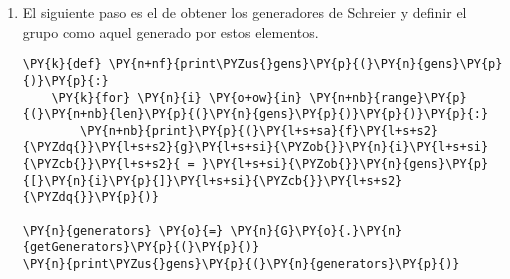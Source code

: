 \begin{enumerate}
    \begin{center}
    \end{center}


Como hemos comentado anteriormente, el número de filas sin contar las cabeceras indica el número de elementos del grupo $G/H$, que coincide con el índice $[G:H]$. En este ejemplo, se tiene:
\[
    [G:H] = \frac{|G|}{|H|} = \frac{|G|}{1} = |G| = 4 \: .
\]

\newpage
Equivalentemente, el grafo de Schreier asociado se llama de la siguiente forma:

    \begin{tcolorbox}[breakable, size=fbox, boxrule=1pt, pad at break*=1mm,colback=cellbackground, colframe=cellborder]
\begin{Verbatim}[commandchars=\\\{\}]
\PY{n}{G}\PY{o}{.}\PY{n}{schreier\PYZus{}graph}\PY{p}{(}\PY{n}{notes}\PY{o}{=}\PY{k+kc}{False}\PY{p}{)}
\end{Verbatim}
\end{tcolorbox}

    \begin{center}
    \end{center}



\item El siguiente paso es el de obtener los generadores de Schreier y definir el grupo como aquel generado por estos elementos.
  
    \begin{tcolorbox}[breakable, size=fbox, boxrule=1pt, pad at break*=1mm,colback=cellbackground, colframe=cellborder]
\begin{Verbatim}[commandchars=\\\{\}]
\PY{k}{def} \PY{n+nf}{print\PYZus{}gens}\PY{p}{(}\PY{n}{gens}\PY{p}{)}\PY{p}{:}
    \PY{k}{for} \PY{n}{i} \PY{o+ow}{in} \PY{n+nb}{range}\PY{p}{(}\PY{n+nb}{len}\PY{p}{(}\PY{n}{gens}\PY{p}{)}\PY{p}{)}\PY{p}{:}
        \PY{n+nb}{print}\PY{p}{(}\PY{l+s+sa}{f}\PY{l+s+s2}{\PYZdq{}}\PY{l+s+s2}{g}\PY{l+s+si}{\PYZob{}}\PY{n}{i}\PY{l+s+si}{\PYZcb{}}\PY{l+s+s2}{ = }\PY{l+s+si}{\PYZob{}}\PY{n}{gens}\PY{p}{[}\PY{n}{i}\PY{p}{]}\PY{l+s+si}{\PYZcb{}}\PY{l+s+s2}{\PYZdq{}}\PY{p}{)}
        
\PY{n}{generators} \PY{o}{=} \PY{n}{G}\PY{o}{.}\PY{n}{getGenerators}\PY{p}{(}\PY{p}{)}
\PY{n}{print\PYZus{}gens}\PY{p}{(}\PY{n}{generators}\PY{p}{)}
\end{Verbatim}
\end{tcolorbox}  


\end{enumerate}
